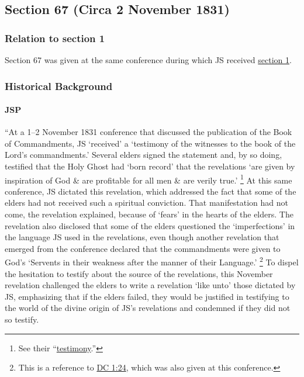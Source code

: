 \subsection{Section 67 (Circa 2 November 1831)}
	\label{DC67}
	
	\subsubsection{Relation to section 1}
	
		Section 67 was given at the same conference during which JS received \hyperref[DC1]{section 1}.
	
	\subsubsection{Historical Background}
		\label{DC67-HB}
		
		\paragraph{JSP}
		
			``At a 1--2 November 1831 conference that discussed the publication of the Book of Commandments, JS `received' a `testimony of the witnesses to the book of the Lord's commandments.' Several elders signed the statement and, by so doing, testified that the Holy Ghost had `born record' that the revelations `are given by inspiration of God \& are profitable for all men \& are verily true.'%
				\footnote{%
					See their ``\hyperref[EMS-1831-JS-CIR-2-NOV-1831-TEST]{testimony}.''
					}
			At this same conference, JS dictated this revelation, which addressed the fact that some of the elders had not received such a spiritual conviction. That manifestation had not come, the revelation explained, because of `fears' in the hearts of the elders. The revelation also disclosed that some of the elders questioned the `imperfections' in the language JS used in the revelations, even though another revelation that emerged from the conference declared that the commandments were given to God's `Servents in their weakness after the manner of their Language.'%
				\footnote{%
					This is a reference to \hyperref[DC1-24]{DC 1:24}, which was also given at this conference.
					}
			To dispel the hesitation to testify about the source of the revelations, this November revelation challenged the elders to write a revelation `like unto' those dictated by JS, emphasizing that if the elders failed, they would be justified in testifying to the world of the divine origin of JS's revelations and condemned if they did not so testify.
			
